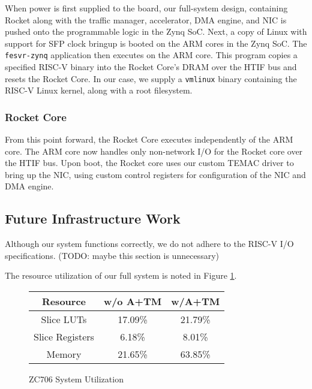    When power is first supplied to the board, our full-system design, containing
    Rocket along with the traffic manager, accelerator, DMA engine, and NIC is 
    pushed onto the programmable logic in the Zynq SoC. Next, a copy of Linux
    with support for SFP clock bringup is booted on the ARM cores in the Zynq
    SoC. The \texttt{fesvr-zynq} application then executes on the ARM core. 
    This program copies a specified RISC-V binary into the Rocket Core's DRAM 
    over the HTIF bus and resets the Rocket Core. In our case, we supply a 
    \texttt{vmlinux} binary containing the RISC-V Linux kernel, along with a 
    root filesystem.

    \subsubsection{Rocket Core}

    From this point forward, the Rocket Core executes independently of the ARM 
    core. The ARM core now handles only non-network I/O for the Rocket core over
    the HTIF bus. Upon boot, the Rocket core uses our custom TEMAC driver to 
    bring up the NIC, using custom control registers for configuration of the
    NIC and DMA engine.


\subsection{Future Infrastructure Work}
    Although our system functions correctly, we do not adhere to the RISC-V
    I/O specifications. (TODO: maybe this section is unnecessary)

    The resource utilization of our full system is noted in Figure \ref{fig:utiltab}.
    

\begin{figure}[t]
\begin{center}
\label{fig:utiltab}
\begin{tabular}{ | c | c | c |  } \hline
    Resource        & w/o A+TM & w/A+TM  \\ \hline
    Slice LUTs      & 17.09\%   &  21.79\%   \\  \hline
    Slice Registers & 6.18\%    &  8.01\%    \\  \hline
    Memory          & 21.65\%   &  63.85\%   \\  \hline
\end{tabular}
\caption{ZC706 System Utilization}
\end{center}
\end{figure}



